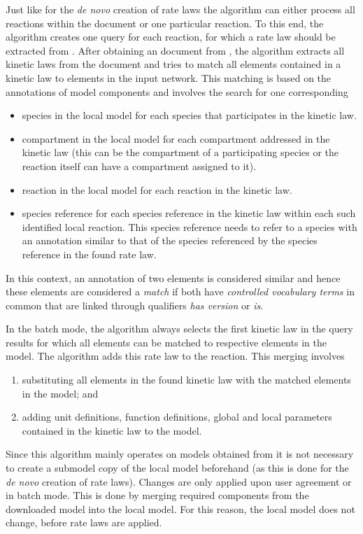 Just like for the \emph{de novo} creation of rate laws the algorithm can either process all reactions within the \SBML document or one particular reaction.
To this end, the algorithm creates one query \URL for each reaction, for which a rate law should be extracted from \SABIO.
After obtaining an \SBML document from \SABIO, the algorithm extracts all kinetic laws from the \SBML document and tries to match all elements contained in a kinetic law to elements in the input network. 
This matching is based on the \MIRIAM annotations of model components and involves the search for one corresponding
\begin{itemize}
  \item species in the local model for each species that participates in the kinetic law.
  \item compartment in the local model for each compartment addressed in the kinetic law (this can be the compartment of a participating species or the reaction itself can have a compartment assigned to it).
  \item reaction in the local model for each reaction in the kinetic law.
  \item species reference for each species reference in the kinetic law within each such identified local reaction. 
This species reference needs to refer to a species with an annotation similar to that of the species referenced by the species reference in the found rate law.
\end{itemize}
In this context, an annotation of two \SBML elements is considered similar and hence these elements are considered a \emph{match} if both have \emph{controlled vocabulary terms} in common that are linked through qualifiers \emph{has version} or \emph{is}.

In the batch mode, the algorithm always selects the first kinetic law in the query results for which all elements can be matched to respective elements in the model.
The algorithm adds this rate law to the reaction.
This merging involves
\begin{enumerate}
  \item substituting all elements in the found kinetic law with the matched elements in the model; and
  \item adding unit definitions, function definitions, global and local parameters contained in the kinetic law to the model.
\end{enumerate}

Since this algorithm mainly operates on models obtained from \SABIO it is not necessary to create a submodel copy of the local model beforehand (as this is done for the \emph{de novo} creation of rate laws).
Changes are only applied upon user agreement or in batch mode.
This is done by merging required components from the downloaded model into the local model.
For this reason, the local model does not change, before rate laws are applied.

